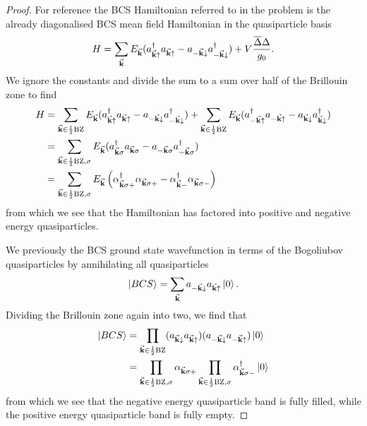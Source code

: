 \begin{proof}
For reference the BCS Hamiltonian referred to in the problem is the already diagonalised BCS mean field Hamiltonian in the quasiparticle basis
\[H = \sum_{\va k}E_{\va k}(a_{\va k\uparrow}^\dagger a_{\va k\uparrow} - a_{-\va k\downarrow}a_{-\va k\downarrow}^\dagger)+V\frac{\overline{\Delta}\Delta}{g_0}.\]
We ignore the constants and divide the sum to a sum over half of the Brillouin zone to find
\begin{align*}
	H &= \sum_{\va k\in \frac 12\text{BZ}}E_{\va k}(a_{\va k\uparrow}^\dagger a_{\va k\uparrow} - a_{-\va k\downarrow}a_{-\va k\downarrow}^\dagger)+\sum_{\va k\in \frac 12\text{BZ}}E_{\va k}(a_{-\va k\uparrow}^\dagger a_{-\va k\uparrow} - a_{\va k\downarrow}a_{\va k\downarrow}^\dagger)\\
	&=\sum_{\va k\in \frac 12\text{BZ},\sigma}E_{\va k}(a_{\va k\sigma}^\dagger a_{\va k\sigma} - a_{-\va k\sigma}a_{-\va k\sigma}^\dagger)\\
	&=\sum_{\va k\in \frac 12\text{BZ},\sigma}E_{\va k}\left(\alpha_{\va k\sigma+}^\dagger \alpha_{\va k\sigma+}- \alpha_{\va k-}^\dagger \alpha_{\va k\sigma-}\right)
\end{align*}
from which we see that the Hamiltonian has factored into positive and negative energy quasiparticles.

We previously the BCS ground state wavefunction in terms of the Bogoliubov quasiparticles by annihilating all quasiparticles
\[\ket{BCS} = \sum_{\va k}a_{-\va k\downarrow}a_{\va k\uparrow}\ket{0}.\]
Dividing the Brillouin zone again into two, we find that
\begin{align*}
	\ket{BCS} &= \prod_{\va k\in \frac 12\text{BZ}}(a_{\va k\downarrow}a_{\va k\uparrow})(a_{-\va k\downarrow}a_{-\va k\uparrow})\ket{0}\\
	&=\prod_{\va k\in \frac12 \text{BZ},\sigma}\alpha_{\va k\sigma+}\prod_{\va k\in \frac12 \text{BZ},\sigma}\alpha_{\va k\sigma-}^\dagger\ket{0}
\end{align*}
from which we see that the negative energy quasiparticle band is fully filled, while the positive energy quasiparticle band is fully empty.
\end{proof}

